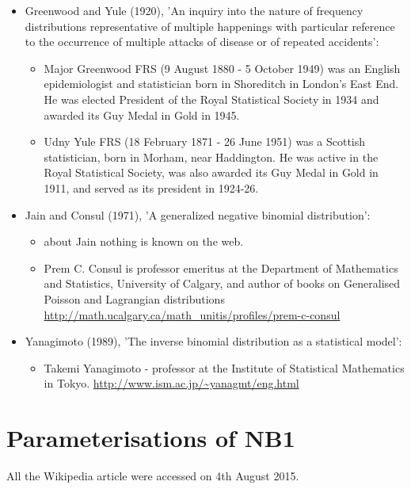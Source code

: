 \begin{itemize}
\item 
Greenwood and Yule (1920), 'An inquiry into the nature of frequency 
distributions representative of multiple happenings with particular 
reference to the occurrence of multiple attacks of disease or of 
repeated accidents':
\begin{itemize}
\item 
Major Greenwood FRS (9 August 1880 - 5 October 1949) was 
an English epidemiologist and statistician born in Shoreditch in 
London's East End. He was elected President of the Royal Statistical 
Society in 1934 and awarded its Guy Medal in Gold in 1945.
\item 
Udny Yule FRS (18 February 1871 - 26 June 1951) was a 
Scottish statistician, born in Morham, near Haddington. He was active 
in the Royal Statistical Society, was also awarded its Guy Medal in Gold 
in 1911, and served as its president in 1924-26.
\end{itemize}
\item 
Jain and Consul (1971), 'A generalized negative binomial distribution':
\begin{itemize}
\item 
about Jain nothing is known on the web.
\item 
Prem C. Consul is professor emeritus at the Department 
of Mathematics and Statistics, University of Calgary, and author of 
books on Generalised Poisson and Lagrangian distributions 
\url{http://math.ucalgary.ca/math_unitis/profiles/prem-c-consul}
\end{itemize}
\item 
Yanagimoto (1989), 'The inverse binomial distribution as a statistical 
model':
\begin{itemize}
\item 
Takemi Yanagimoto - professor at the Institute of 
Statistical Mathematics in Tokyo.
\url{http://www.ism.ac.jp/~yanagmt/eng.html}
\end{itemize}
\end{itemize}


\section{Parameterisations of NB1}
All the Wikipedia article were accessed on 4th August 2015.
